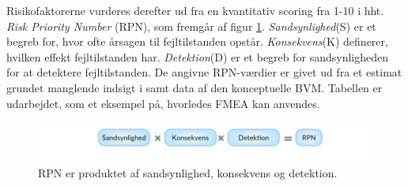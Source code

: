 	Risikofaktorerne vurderes derefter ud fra en kvantitativ scoring fra 1-10 i hht. \textit{Risk Priority Number}{} (RPN), som fremgår af figur \ref{fig:rpn}. \textit{Sandsynlighed}{}(S) er et begreb for, hvor ofte årsagen til fejltilstanden opstår. \textit{Konsekvens}{}(K) definerer, hvilken effekt fejltilstanden har. \textit{Detektion}{}(D) er et begreb for sandsynligheden for at detektere fejltilstanden. De angivne RPN-værdier er givet ud fra et estimat grundet manglende indsigt i samt data af den konceptuelle BVM. Tabellen er udarbejdet, som et eksempel på, hvorledes FMEA kan anvendes. 	
	 
	\begin{figure}[htb]
	\centering
	\includegraphics[width=5in]{RPN}
	\caption	{RPN er produktet af sandsynlighed, konsekvens og detektion.}
	\label{fig:rpn}
	\end{figure}

